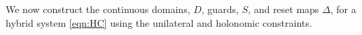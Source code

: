 
 We now construct the continuous domains, $D$, guards, $S$, and reset maps $\Delta$, for a hybrid system \eqref{eqn:HC} using the unilateral and holonomic constraints.

